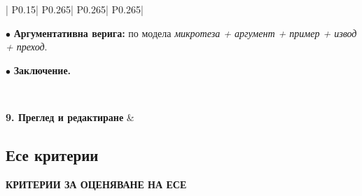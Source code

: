 \documentclass[12pt,a4paper]{article}
\begin{document}
\begin{longtable}{|
    P{0.15\textwidth}|
    P{0.265\textwidth}|
    P{0.265\textwidth}|
    P{0.265\textwidth}|
}
{\par\medskip

$\bullet$ \textbf{Аргументативна верига:}
по модела
\textit{микротеза + аргумент + пример + извод + преход}.

\par\medskip

$\bullet$ \textbf{Заключение.}
}
\\
\hline


\textbf{9. Преглед и редактиране}
&
\\
\hline

\end{longtable}

\vspace{-0.4cm}

\subsection{Есе критерии}
\begin{center}
\textbf{КРИТЕРИИ ЗА ОЦЕНЯВАНЕ НА ЕСЕ}
\end{center}

\vspace{-0.1cm}
\end{document}
